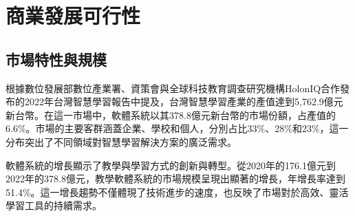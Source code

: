 \section{商業發展可行性}

\subsection{市場特性與規模}

根據數位發展部數位產業署、資策會與全球科技教育調查研究機構HolonIQ合作發布的2022年台灣智慧學習報告中提及，台灣智慧學習產業的產值達到5,762.9億元新台幣。在這一市場中，軟體系統以其378.8億元新台幣的市場份額，占產值的6.6\%。市場的主要客群涵蓋企業、學校和個人，分別占比33\%、28\%和23\%，這一分布突出了不同領域對智慧學習解決方案的廣泛需求。

軟體系統的增長顯示了教學與學習方式的創新與轉型。從2020年的176.1億元到2022年的378.8億元，教學軟體系統的市場規模呈現出顯著的增長，年增長率達到51.4\%。這一增長趨勢不僅體現了技術進步的速度，也反映了市場對於高效、靈活學習工具的持續需求。





